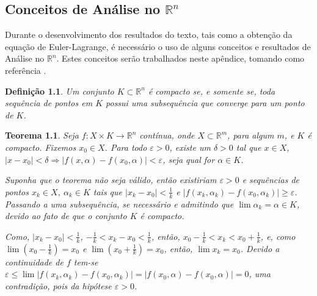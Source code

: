 \documentclass[
	12pt,				%
	openright,			%
    twoside,			%
	a4paper,			%
	english,			%
	french,				%
	spanish,			%
	brazil				%
	]{abntex2}
\makeatletter
\newtheorem{teorema}{Teorema}
\newtheorem{definicao}{Definição}
\renewenvironment{proof}[1][\proofname]{
	\par\pushQED{\qed}%
	\normalfont \topsep6\p@\@plus6\p@\relax
	\trivlist
	\item\relax
		{\itshape
			#1\@addpunct{.}}\hspace\labelsep\ignorespaces
}{%
	\popQED\endtrivlist\@endpefalse
}
\numberwithin{lema}{chapter}
\numberwithin{teorema}{chapter}
\numberwithin{definicao}{chapter}
\numberwithin{exemplo}{chapter}
\numberwithin{figure}{chapter}
\makeatother
\begin{document}
\begin{apendicesenv}

\partapendices

\chapter{Conceitos de Análise no $\mathbb{R}^n$}
\label{apend:regra_de_leibniz}
{
	Durante o desenvolvimento dos resultados do texto, tais como a obtenção da equação de Euler-Lagrange, é necessário o uso de alguns conceitos e resultados de Análise no $\mathbb{R}^n$. Estes conceitos serão trabalhados neste apêndice, tomando como referência .

	\begin{definicao}
		Um conjunto $K\subset \mathbb{R}^n$ é compacto se, e somente se, toda sequência de pontos em $K$ possui uma subsequência que converge para um ponto de $K$.
	\end{definicao}

	\begin{teorema}
		\label{teorema:func_uniformemente}
		Seja $f:X\times K \longrightarrow \mathbb{R}^n$ contínua, onde $X\subset \mathbb{R}^m$, para algum $m$, e $K$ é compacto. Fixemos $x_0 \in X$. Para todo $\varepsilon > 0$, existe um $\delta > 0$ tal que $x\in X$, $|x-x_0|<\delta \Longrightarrow |f(x, \alpha)-f(x_0,\alpha)|<\varepsilon$, seja qual for $\alpha \in K$.
		\begin{proof}
		Suponha que o teorema não seja válido, então existiriam $\varepsilon > 0$ e sequências de pontos $x_k\in X$, $\alpha_k \in K$ tais que $|x_k-x_0|<\frac{1}{k}$ e $|f(x_k,\alpha_k)-f(x_0,\alpha_k)|\geqslant \varepsilon$. Passando a uma subsequência, se necessário e admitindo que $\lim \alpha_k=\alpha \in K$, devido ao fato de que o conjunto $K$ é compacto.
		
		Como, $|x_k-x_0|<\frac{1}{k}$, $-\frac{1}{k}<x_k-x_0<\frac{1}{k}$, então, $x_0-\frac{1}{k}<x_k<x_0+\frac{1}{k}$, e, como $\lim \left (x_0-\frac{1}{k} \right ) = x_0$ e $\lim \left ( x_0 + \frac{1}{k} \right )=x_0$, então, $\lim x_k=x_0$. Devido a continuidade de $f$ tem-se $\varepsilon \leqslant \lim |f(x_k,\alpha_k)-f(x_0,\alpha _k)|=|f(x_0,\alpha)-f(x_0,\alpha)|=0$, uma contradição, pois da hipótese $\varepsilon >0$.
		\end{proof}
	\end{teorema}
	
}
\end{apendicesenv}
\end{document}
